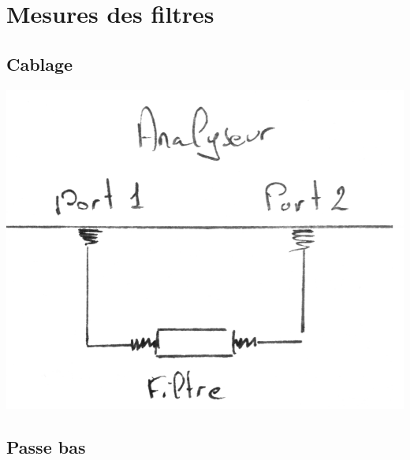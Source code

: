 \documentclass[a4paper,12pt]{report}            %
\begin{document}
\chapter{Mesures des filtres}

\section{Cablage}

\begin{center}\includegraphics[scale = 0.2]{pic/Cablage_filtre.png}\\ \end{center}

\section{Passe bas}
\end{document}
